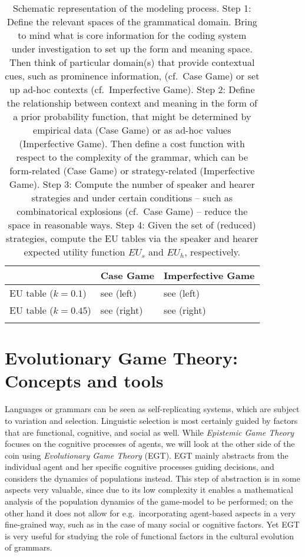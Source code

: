 \documentclass[output=paper,hidelinks]{langscibook}
\begin{document}
\begin{table}
\begin{subtable}{\textwidth}
\begin{tabularx}{\textwidth}{Qp{.25\textwidth}Q}
\lsptoprule
& Case Game & Imperfective Game \\\midrule
EU table ($k=0.1$) & see  (left) & see  (left)   \\
EU table ($k=0.45$)  & see  (right) & see  (right)  \\\lspbottomrule
\end{tabularx}
\end{subtable}
\caption{Schematic representation of the modeling process. Step 1: Define the relevant spaces of the grammatical domain. Bring to mind what is core information for the coding system under investigation to set up the form and meaning space. Then think of particular domain(s) that provide contextual cues, such as prominence information, (cf.~Case Game) or set up ad-hoc  contexts (cf.~Imperfective Game). Step 2: Define the relationship between context and meaning in the form of a prior probability function, that might be determined by empirical data (Case Game) or as ad-hoc values (Imperfective Game). Then define a cost function with respect to the complexity of the grammar, which can be form-related (Case Game) or strategy-related (Imperfective Game). Step 3: Compute the number of speaker and hearer strategies and under certain conditions -- such as combinatorical explosions (cf.~Case Game) -- reduce the space in reasonable ways. Step 4: Given the set of (reduced) strategies, compute the EU tables via the speaker and hearer expected utility function $EU_s$ and $EU_h$, respectively. }
\label{sceme-model}
\end{table}


\section{Evolutionary Game Theory: Concepts and tools}
\label{sec:EGT}
 
Languages or grammars can be seen as self-replicating systems, which are subject to variation and selection. 
Linguistic selection is most certainly guided by factors that are functional, cognitive, and social as well. While \emph{Epistemic Game Theory} focuses on the cognitive processes of agents, we will look at the other side of the coin using \emph{Evolutionary Game Theory} (EGT). EGT mainly abstracts from the individual agent and her specific cognitive processes guiding decisions, and considers the dynamics of populations instead. This step of abstraction is in some aspects very valuable, since due to its low complexity it enables a mathematical analysis of the population dynamics of the game-model to be performed; on the other hand it does not allow for e.g.~incorporating agent-based aspects in a very fine-grained way, such as in the case of many social or cognitive factors. Yet EGT is very useful for studying the role of functional factors in the cultural evolution of grammars.  
 
\end{document}
